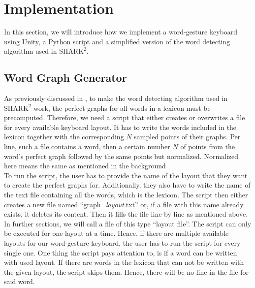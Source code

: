 \chapter{Implementation}

In this section, we will introduce how we implement a word-gesture keyboard using Unity, a Python script and a simplified version of the word detecting algorithm used in $\text{SHARK}^2$.

\section{Word Graph Generator}
As previously discussed in , to make the word detecting algorithm used in $\text{SHARK}^2$ work, the perfect graphs for all words in a lexicon must be precomputed. Therefore, we need a script that either creates or overwrites a file for every available keyboard layout. It has to write the words included in the lexicon together with the corresponding $N$ sampled points of their graphs. Per line, such a file contains a word, then a certain number $N$ of points from the word's perfect graph followed by the same points but normalized. Normalized here means the same as mentioned in the background .\\
To run the script, the user has to provide the name of the layout that they want to create the perfect graphs for. Additionally, they also have to write the name of the text file containing all the words, which is the lexicon. The script then either creates a new file named ``graph\_\textit{layout}.txt'' or, if a file with this name already exists, it deletes its content. Then it fills the file line by line as mentioned above. In further sections, we will call a file of this type ``layout file''. The script can only be executed for one layout at a time. Hence, if there are multiple available layouts for our word-gesture keyboard, the user has to run the script for every single one. One thing the script pays attention to, is if a word can be written with used layout. If there are words in the lexicon that can not be written with the given layout, the script skips them. Hence, there will be no line in the file for said word. 

